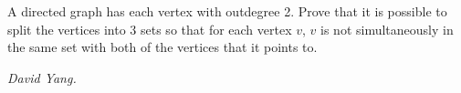 A directed graph has each vertex with outdegree 2. Prove that it is possible to split the vertices into 3 sets so that for each vertex $v$, $v$ is not simultaneously in the same set with both of the vertices that it points to.

\textit{David Yang.}

